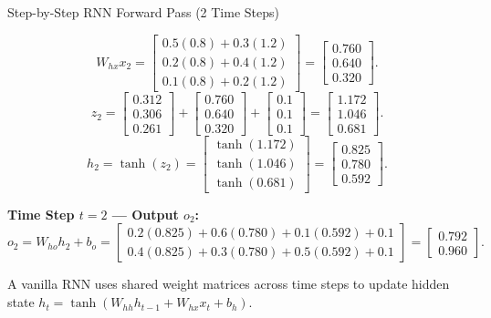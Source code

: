 \documentclass[a4paper,11pt]{article}
\begin{document}
\begin{worked}{Step-by-Step RNN Forward Pass (2 Time Steps)}
\begin{steps}
        $$W_{hx} x_2 = \begin{bmatrix} 0.5(0.8)+0.3(1.2) \\ 0.2(0.8)+0.4(1.2) \\ 0.1(0.8)+0.2(1.2) \end{bmatrix} = \begin{bmatrix} 0.760 \\ 0.640 \\ 0.320 \end{bmatrix}.$$
        $$z_2 = \begin{bmatrix} 0.312 \\ 0.306 \\ 0.261 \end{bmatrix} + \begin{bmatrix} 0.760 \\ 0.640 \\ 0.320 \end{bmatrix} + \begin{bmatrix} 0.1 \\ 0.1 \\ 0.1 \end{bmatrix} = \begin{bmatrix} 1.172 \\ 1.046 \\ 0.681 \end{bmatrix}.$$
        $$h_2 = \tanh(z_2) = \begin{bmatrix} \tanh(1.172) \\ \tanh(1.046) \\ \tanh(0.681) \end{bmatrix} = \begin{bmatrix} 0.825 \\ 0.780 \\ 0.592 \end{bmatrix}.$$
  \item \textbf{Time Step $t=2$ — Output $o_2$:}
        $$o_2 = W_{ho} h_2 + b_o = \begin{bmatrix} 0.2(0.825)+0.6(0.780)+0.1(0.592) + 0.1 \\ 0.4(0.825)+0.3(0.780)+0.5(0.592) + 0.1 \end{bmatrix} = \begin{bmatrix} 0.792 \\ 0.960 \end{bmatrix}.$$
\end{steps}
\end{worked}

\begin{keytake}
A vanilla RNN uses shared weight matrices across time steps to update hidden state $h_t = \tanh(W_{hh} h_{t-1} + W_{hx} x_t + b_h)$.
\end{keytake}
\end{document}

